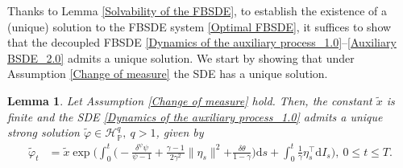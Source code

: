 \documentclass[12,reqno]{amsart}
\numberwithin{equation}{section}
\newtheorem{lemm}[defi]{Lemma}
\begin{document}
Thanks to Lemma \ref{Solvability of the FBSDE}, to establish the existence of a (unique) solution to the FBSDE system \eqref{Optimal FBSDE}, it suffices to show that the decoupled FBSDE \eqref{Dynamics of the auxiliary process_1.0}–\eqref{Auxiliary BSDE_2.0} admits a unique solution. We start by showing that under Assumption \ref{Change of measure} the SDE has a unique solution.
\begin{lemm}\label{Solution to the auxiliary SDE}
	Let Assumption \ref{Change of measure} hold. Then, the constant $\widetilde{x}$ is finite and the SDE \eqref{Dynamics of the auxiliary process_1.0} admits a unique strong solution $\widetilde{\varphi}\in\mathcal{H}_{\mathbb{P}}^{q},~q>1$, given by
	\begin{align}\label{Auxiliary process_1}
		\widetilde{\varphi}_{t}&=\widetilde{x}\exp\Big(\int_{0}^{t}\Big(-\frac{\delta^{\psi}\psi}{\psi-1}+\frac{\gamma-1}{2\gamma^{2}}\|\eta_{s}\|^{2}{+\frac{\delta\theta}{1-\gamma}}\Big)\mathrm{d}s+\int_{0}^{t}\frac{1}{\gamma}\eta_{s}^{\top}\mathrm{d}I_{s}\Big),~0\le t\le T.
	\end{align}
\end{lemm}
\end{document}
